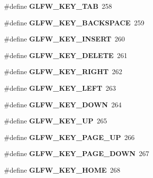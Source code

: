 \begin{DoxyCompactItemize}
\mbox{\label{group__keys_ga6908a4bda9950a3e2b73f794bbe985df}} 
\#define {\bfseries G\+L\+F\+W\+\_\+\+K\+E\+Y\+\_\+\+T\+AB}~258
\item 
\mbox{\label{group__keys_ga6c0df1fe2f156bbd5a98c66d76ff3635}} 
\#define {\bfseries G\+L\+F\+W\+\_\+\+K\+E\+Y\+\_\+\+B\+A\+C\+K\+S\+P\+A\+CE}~259
\item 
\mbox{\label{group__keys_ga373ac7365435d6b0eb1068f470e34f47}} 
\#define {\bfseries G\+L\+F\+W\+\_\+\+K\+E\+Y\+\_\+\+I\+N\+S\+E\+RT}~260
\item 
\mbox{\label{group__keys_gadb111e4df74b8a715f2c05dad58d2682}} 
\#define {\bfseries G\+L\+F\+W\+\_\+\+K\+E\+Y\+\_\+\+D\+E\+L\+E\+TE}~261
\item 
\mbox{\label{group__keys_ga06ba07662e8c291a4a84535379ffc7ac}} 
\#define {\bfseries G\+L\+F\+W\+\_\+\+K\+E\+Y\+\_\+\+R\+I\+G\+HT}~262
\item 
\mbox{\label{group__keys_gae12a010d33c309a67ab9460c51eb2462}} 
\#define {\bfseries G\+L\+F\+W\+\_\+\+K\+E\+Y\+\_\+\+L\+E\+FT}~263
\item 
\mbox{\label{group__keys_gae2e3958c71595607416aa7bf082be2f9}} 
\#define {\bfseries G\+L\+F\+W\+\_\+\+K\+E\+Y\+\_\+\+D\+O\+WN}~264
\item 
\mbox{\label{group__keys_ga2f3342b194020d3544c67e3506b6f144}} 
\#define {\bfseries G\+L\+F\+W\+\_\+\+K\+E\+Y\+\_\+\+UP}~265
\item 
\mbox{\label{group__keys_ga3ab731f9622f0db280178a5f3cc6d586}} 
\#define {\bfseries G\+L\+F\+W\+\_\+\+K\+E\+Y\+\_\+\+P\+A\+G\+E\+\_\+\+UP}~266
\item 
\mbox{\label{group__keys_gaee0a8fa442001cc2147812f84b59041c}} 
\#define {\bfseries G\+L\+F\+W\+\_\+\+K\+E\+Y\+\_\+\+P\+A\+G\+E\+\_\+\+D\+O\+WN}~267
\item 
\mbox{\label{group__keys_ga41452c7287195d481e43207318c126a7}} 
\#define {\bfseries G\+L\+F\+W\+\_\+\+K\+E\+Y\+\_\+\+H\+O\+ME}~268

\end{DoxyCompactItemize}
